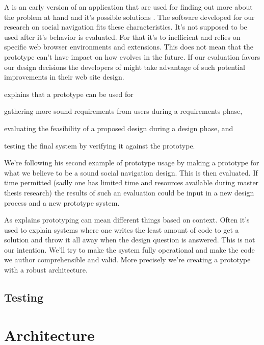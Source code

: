 A  is an early version of an application that are used for
finding out more about the problem at hand and it's possible solutions
\citep[]{sommerville07}.
The software developed for our research on social navigation fits these
characteristics. It's not supposed to be used after it's behavior is
evaluated. For that it's to inefficient and relies on specific web browser
environments and extensions. This does not mean that the prototype can't have
impact on how \urort{} evolves in the future. If our evaluation favors our
design decisions the developers of \urort{} might take advantage of such
potential improvements in their web site design.

\citet[p--410]{sommerville07} explains that a prototype can be used for
\begin{inparaenum}[(i)]
  \item gathering more sound requirements from users during a
    requirements phase,
  \item evaluating the feasibility of a proposed design during a
    design phase, and
  \item testing the final system by verifying it against the prototype.
\end{inparaenum}
We're following his second example of prototype usage by making a prototype
for what we believe to be a sound social navigation design. This is then
evaluated. If time permitted (sadly one has limited time and resources
available during master thesis research) the results of such an evaluation
could be input in a new design process and a new prototype system.

As \citet[]{mcconnell04} explains prototyping can mean different things
based on context. Often it's used to explain systems where one writes the
least amount of code to get a solution and throw it all away when the design
question is answered. This is not our intention. We'll try to make the system
fully operational and make the code we author comprehensible and
valid. More precisely we're creating a  prototype
\cite[]{rudd96} with a robust architecture.

\subsection{Testing}


\section{Architecture}

